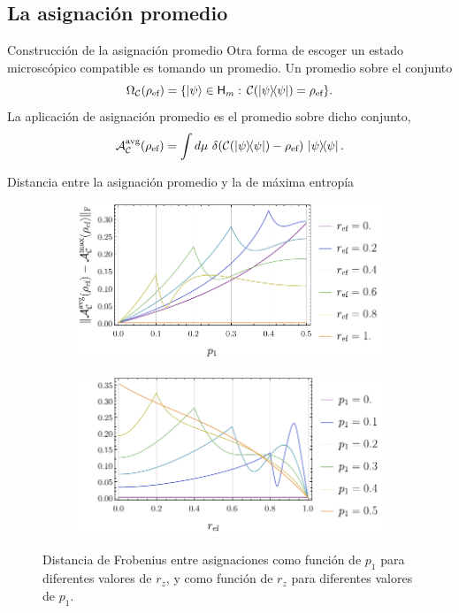 \subsection{La asignación promedio}
\begin{frame}{Construcción de la asignación promedio}
    Otra forma de escoger un estado microscópico compatible es tomando un promedio. Un promedio sobre el conjunto
    \begin{equation}
        \Omega_{\mcC}(\rho_{\ef}) = \{\ket{\psi}\in\hilbert_{m}:\, \mcC(\dyad{\psi}) = \rho_{\ef}  \}.\nonumber
    \end{equation}
    La aplicación de asignación promedio es el promedio sobre dicho conjunto, \ie 
    \begin{equation}
        \mcA_{\mcC}^{\avg}(\rho_{\ef}) =\int d \mu\,\, \delta(\mcC(\dyad{\psi})-\rho_{\ef})\,\dyad{\psi}.\nonumber
    \end{equation}
\end{frame}
\begin{frame}{Distancia entre la asignación promedio y la de máxima entropía}
    \begin{figure}
        \centering
        \begin{subfigure}{.45\textwidth}
          \centering
          \includegraphics[width=1.\linewidth]{figures/avg_results/dist_maxent_avg_vs_p.pdf}
        \end{subfigure}%
        \begin{subfigure}{.45\textwidth}
          \centering
          \includegraphics[width=1.\linewidth]{figures/avg_results/dist_maxent_avg_vs_z.pdf}
        \end{subfigure}
        \caption{Distancia de Frobenius entre asignaciones como función de $p_{1}$ para diferentes valores de $r_{z}$, y como función de $r_{z}$ para diferentes valores de $p_{1}$.}
    \end{figure}
\end{frame}
